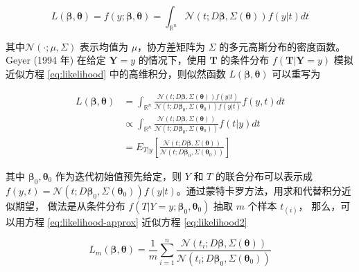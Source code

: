 \documentclass[12pt,a4paper,UTF8,twoside]{book}
\theoremstyle{definition}
\theoremstyle{definition}
\theoremstyle{definition}
\theoremstyle{remark}
\begin{document}
\begin{equation}
L(\boldsymbol{\beta},\boldsymbol{\theta}) = f(y;\boldsymbol{\beta},\boldsymbol{\theta}) = \int_{\mathbb{R}^{n}}\mathcal{N}(t;D\boldsymbol{\beta},\Sigma(\boldsymbol{\theta}))f(y|t)dt \label{eq:likelihood}
\end{equation}

\noindent 其中\(\mathcal{N}(\cdot;\mu,\Sigma)\) 表示均值为 \(\mu\)，协方差矩阵为 \(\Sigma\) 的多元高斯分布的密度函数。Geyer (1994 年)\citep{Geyer1994On} 在给定 \(\mathbf{Y}=y\) 的情况下，使用 \(\mathbf{T}\) 的条件分布 \(f(\mathbf{T}|\mathbf{Y}=y)\) 模拟近似方程 \eqref{eq:likelihood} 中的高维积分，则似然函数 \(L(\boldsymbol{\beta},\boldsymbol{\theta})\) 可以重写为

\begin{equation}
\begin{aligned}
L(\boldsymbol{\beta},\boldsymbol{\theta})
& = \int_{\mathbb{R}^{n}} \frac{\mathcal{N}(t;D\boldsymbol{\beta},\Sigma(\boldsymbol{\theta}))f(y|t)}{\mathcal{N}(t;D\boldsymbol{\beta}_{0},\Sigma(\boldsymbol{\theta}_{0}))f(y|t)}f(y,t)dt \\
& \varpropto \int_{\mathbb{R}^{n}} \frac{\mathcal{N}(t;D\boldsymbol{\beta}, \Sigma(\boldsymbol{\theta}))}{\mathcal{N}(t;D\boldsymbol{\beta}_{0}, \Sigma(\boldsymbol{\theta}_{0}))}f(t|y)dt \\
&= E_{T|y}\left[\frac{\mathcal{N}(t; D\boldsymbol{\beta}, \Sigma(\boldsymbol{\theta}))}{\mathcal{N}(t; D\boldsymbol{\beta}_{0}, \Sigma(\boldsymbol{\theta}_{0}))}\right] 
\end{aligned} \label{eq:likelihood2}
\end{equation}

\noindent 其中 \(\boldsymbol{\beta}_{0},\boldsymbol{\theta}_{0}\) 作为迭代初始值预先给定，则 \(Y\) 和 \(T\) 的联合分布可以表示成 \(f(y,t) = \mathcal{N}(t; D\boldsymbol{\beta}_{0}, \Sigma(\boldsymbol{\theta}_{0})) f(y|t)\)。通过蒙特卡罗方法，用求和代替积分近似期望， 做法是从条件分布 \(f(T|Y=y; \boldsymbol{\beta}_0, \boldsymbol{\theta}_0)\) 抽取 \(m\) 个样本 \(t_{(i)}\)， 那么，可以用方程 \eqref{eq:likelihood-approx} 近似方程 \eqref{eq:likelihood2}

\begin{equation}
L_{m}(\boldsymbol{\beta},\boldsymbol{\theta})=\frac{1}{m}\sum_{i=1}^{n}\frac{\mathcal{N}(t_{i};D\boldsymbol{\beta},\Sigma(\boldsymbol{\theta}))}{\mathcal{N}(t_{i};D\boldsymbol{\beta}_{0},\Sigma(\boldsymbol{\theta}_{0}))} \label{eq:likelihood-approx}
\end{equation}
\end{document}

